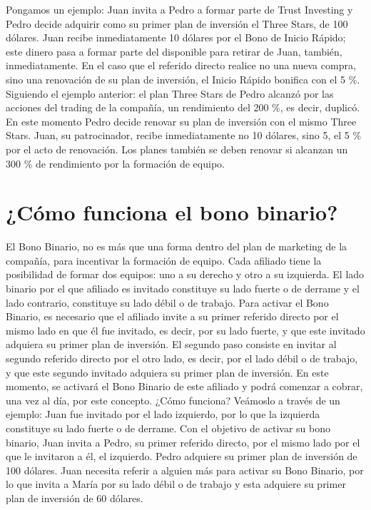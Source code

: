 \documentclass[12pt,letterpaper]{article}
\begin{document}
Pongamos un ejemplo: Juan invita a Pedro a formar parte de Trust Investing y Pedro decide adquirir como su primer plan de inversión el Three Stars, de 100 dólares. Juan recibe inmediatamente 10 dólares por el Bono de Inicio Rápido; este dinero pasa a formar parte del disponible para retirar de Juan, también, inmediatamente. En el caso que el referido directo realice no una nueva compra, sino una renovación de su plan de inversión, el Inicio Rápido bonifica con el 5 \%. Siguiendo el ejemplo anterior: el plan Three Stars de Pedro alcanzó por las acciones del trading de la compañía, un rendimiento del 200 \%, es decir, duplicó. En este momento Pedro decide renovar su plan de inversión con el mismo Three Stars. Juan, su patrocinador, recibe inmediatamente no 10 dólares, sino 5, el 5 \% por el acto de renovación. Los planes también se deben renovar si alcanzan un 300 \% de rendimiento por la formación de equipo.

\section{¿Cómo funciona el bono binario?}
El Bono Binario, no es más que una forma dentro del plan de marketing de la compañía, para incentivar la formación de equipo. Cada afiliado tiene la posibilidad de formar dos equipos: uno a su derecho y otro a su izquierda. El lado binario por el que afiliado es invitado constituye su lado fuerte o de derrame y el lado contrario, constituye su lado débil o de trabajo. Para activar el Bono Binario, es necesario que el afiliado invite a su primer referido directo por el mismo lado en que él fue invitado, es decir, por su lado fuerte, y que este invitado adquiera su primer plan de inversión. El segundo paso consiste en invitar al segundo referido directo por el otro lado, es decir, por el lado débil o de trabajo, y que este segundo invitado adquiera su primer plan de inversión. En este momento, se activará el Bono Binario de este afiliado y podrá comenzar a cobrar, una vez al día, por este concepto. ¿Cómo funciona? Veámoslo a través de un ejemplo: Juan fue invitado por el lado izquierdo, por lo que la izquierda constituye su lado fuerte o de derrame. Con el objetivo de activar su bono binario, Juan invita a Pedro, su primer referido directo, por el mismo lado por el que le invitaron a él, el izquierdo. Pedro adquiere su primer plan de inversión de 100 dólares. Juan necesita referir a alguien más para activar su Bono Binario, por lo que invita a María por su lado débil o de trabajo y esta adquiere su primer plan de inversión de 60 dólares.
\end{document}
